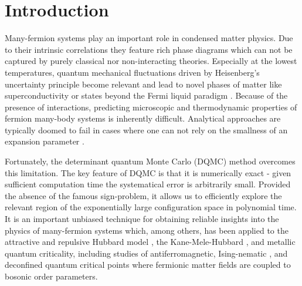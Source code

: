 \documentclass[submission, Phys]{SciPost}
\begin{document}
\section{Introduction}


Many-fermion systems play an important role in condensed matter physics. Due to their intrinsic correlations they feature rich phase diagrams which can not be captured by purely classical nor non-interacting theories. Especially at the lowest temperatures, quantum mechanical fluctuations driven by Heisenberg's uncertainty principle become relevant and lead to novel phases of matter like superconductivity or states beyond the Fermi liquid paradigm \cite{Bauer2020, Schattner2016}. Because of the presence of interactions, predicting microscopic and thermodynamic properties of fermion many-body systems is inherently difficult. Analytical approaches are typically doomed to fail in cases where one can not rely on the smallness of an expansion parameter \cite{Berg2019}.

Fortunately, the determinant quantum Monte Carlo (DQMC) method \cite{Blankenbecler1981, Loh2005, Scalapino1993, Santos2003, Assaad2002a} overcomes this limitation. The key feature of DQMC is that it is numerically exact - given sufficient computation time the systematical error is arbitrarily small. Provided the absence of the famous sign-problem\cite{Loh1990, Troyer2005}, it allows us to efficiently explore the relevant region of the exponentially large configuration space in polynomial time. It is an important unbiased technique for obtaining reliable insights into the physics of many-fermion systems which, among others, has been applied to the attractive and repulsive Hubbard model \cite{Hirsch1985, White1989, Moreo1991}, the Kane-Mele-Hubbard \cite{Hohenadler2012}, and metallic quantum criticality, including studies of antiferromagnetic\cite{Bauer2020, Schattner2016, Gerlach2017, Berg2019}, Ising-nematic \cite{SchattnerLederer2016}, and deconfined quantum critical points \cite{Gazit2017} where fermionic matter fields are coupled to bosonic order parameters.
\end{document}
